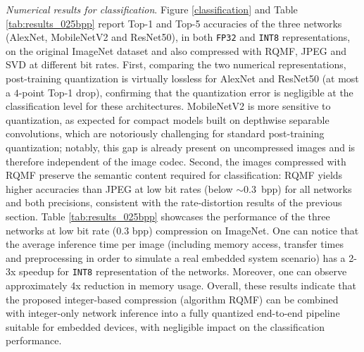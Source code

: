 \documentclass[lettersize,journal]{IEEEtran}
\begin{document}
\noindent \textit{Numerical results for classification}.
Figure \ref{classification} and Table \ref{tab:results_025bpp} 
report Top-1 and Top-5 accuracies of the three networks (AlexNet,
MobileNetV2 and ResNet50), in both \texttt{FP32} and \texttt{INT8}
representations, on the original ImageNet dataset and also compressed with RQMF, JPEG and SVD at different bit rates. First, comparing the two numerical representations,
post-training quantization is virtually lossless for AlexNet and ResNet50
(at most a $4$-point Top-1 drop), confirming that the quantization error is
negligible at the classification level for these architectures. MobileNetV2
is more sensitive to quantization, as expected for compact models built on
depthwise separable convolutions, which are notoriously challenging for
standard post-training quantization; notably, this gap is already present on
uncompressed images and is therefore independent of the image codec. Second,
the images compressed with RQMF preserve the semantic content required for
classification: RQMF yields higher accuracies than JPEG at low bit rates
(below ${\sim}0.3$~bpp) for all networks and both precisions, consistent
with the rate-distortion results of the previous section. Table \ref{tab:results_025bpp} showcases the performance of the three networks at low bit rate (0.3 bpp) compression on ImageNet. One can notice that the average inference time per image (including memory access, transfer times and preprocessing  in order to simulate a real embedded system scenario) has a 2-3x speedup for \texttt{INT8} representation of the networks.  Moreover, one can observe approximately 4x reduction in memory usage. Overall, these results indicate that the proposed integer-based compression (algorithm RQMF)  can be combined with integer-only network inference into a fully quantized end-to-end pipeline suitable for embedded devices, with negligible impact on the
classification performance.
\end{document}
